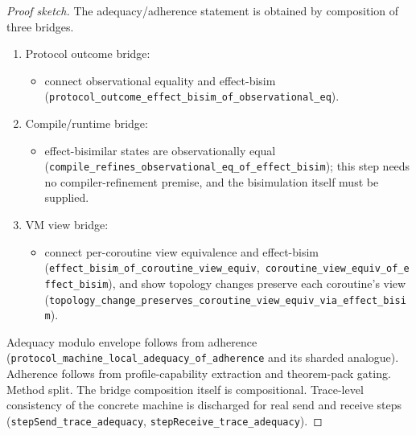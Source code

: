 \documentclass[a4paper,10pt,twocolumn,english]{article}
\numberwithin{equation}{section}
\theoremstyle{paperdef}
\theoremstyle{paperplain}
\theoremstyle{paperdef}
\theoremstyle{paperremark}
\theoremstyle{paperdef}
\begin{document}
\begin{proof}[Proof sketch]
	The adequacy/adherence statement is obtained by composition of three bridges.

	\begin{enumerate}
		\item Protocol outcome bridge:
		      \begin{itemize}
			      \item connect observational equality and effect-bisim (\nolinkurl{protocol_outcome_effect_bisim_of_observational_eq}).
		      \end{itemize}
		\item Compile/runtime bridge:
		      \begin{itemize}
			      \item effect-bisimilar states are observationally equal (\nolinkurl{compile_refines_observational_eq_of_effect_bisim}); this step needs no compiler-refinement premise, and the bisimulation itself must be supplied.
		      \end{itemize}
		\item VM view bridge:
		      \begin{itemize}
			      \item connect per-coroutine view equivalence and effect-bisim (\nolinkurl{effect_bisim_of_coroutine_view_equiv},\allowbreak\ \nolinkurl{coroutine_view_equiv_of_effect_bisim}), and show topology changes preserve each coroutine's view (\nolinkurl{topology_change_preserves_coroutine_view_equiv_via_effect_bisim}).
		      \end{itemize}
	\end{enumerate}

	Adequacy modulo envelope follows from adherence (\nolinkurl{protocol_machine_local_adequacy_of_adherence} and its sharded analogue). Adherence follows from profile-capability extraction and theorem-pack gating.
	Method split. The bridge composition itself is compositional. Trace-level
	consistency of the concrete machine is discharged for real send and receive
	steps (\nolinkurl{stepSend_trace_adequacy}, \nolinkurl{stepReceive_trace_adequacy}).
\end{proof}
\end{document}
